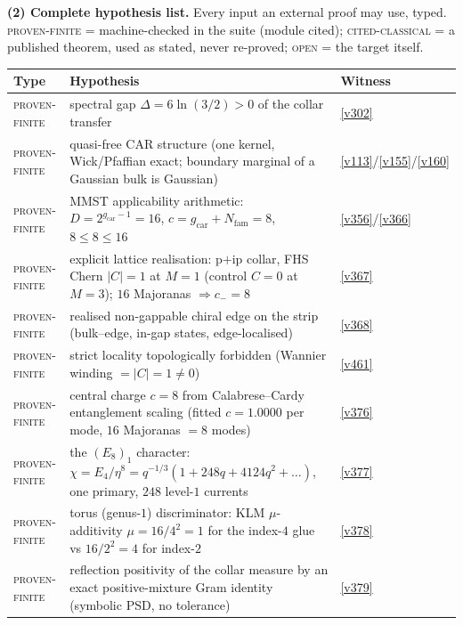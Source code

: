 \documentclass[11pt,a4paper]{article}
\newcommand{\Nfam}{N_{\mathrm{fam}}}
\newcommand{\gcar}{g_{\mathrm{car}}}
\begin{document}
\par\smallskip\noindent\textbf{(2) Complete hypothesis list.} Every input an external proof may
use, typed. \textsc{proven-finite} = machine-checked in the suite (module cited);
\textsc{cited-classical} = a published theorem, used as stated, never re-proved;
\textsc{open} = the target itself.
\begin{center}\footnotesize
\renewcommand{\arraystretch}{1.22}
\begin{tabularx}{\linewidth}{@{}l>{\hsize=1.45\hsize\raggedright\arraybackslash}X>{\hsize=0.55\hsize\raggedright\arraybackslash}X@{}}
\toprule
\textbf{Type} & \textbf{Hypothesis} & \textbf{Witness} \\
\midrule
\textsc{proven-finite} & spectral gap $\Delta=6\ln(3/2)>0$ of the collar transfer & \vref{v302} \\
\textsc{proven-finite} & quasi-free CAR structure (one kernel, Wick/Pfaffian exact; boundary marginal of a Gaussian bulk is Gaussian) & \vref{v113}/\vref{v155}/\vref{v160} \\
\textsc{proven-finite} & MMST applicability arithmetic: $D=2^{\gcar-1}=16$, $c=\gcar+\Nfam=8$, $8\le8\le16$ & \vref{v356}/\vref{v366} \\
\textsc{proven-finite} & explicit lattice realisation: p$+$ip collar, FHS Chern $|C|=1$ at $M{=}1$ (control $C=0$ at $M{=}3$); $16$ Majoranas $\Rightarrow c_-=8$ & \vref{v367} \\
\textsc{proven-finite} & realised non-gappable chiral edge on the strip (bulk--edge, in-gap states, edge-localised) & \vref{v368} \\
\textsc{proven-finite} & strict locality topologically forbidden (Wannier winding $=|C|=1\neq0$) & \vref{v461} \\
\textsc{proven-finite} & central charge $c=8$ from Calabrese--Cardy entanglement scaling (fitted $c=1.0000$ per mode, $16$ Majoranas $=8$ modes) & \vref{v376} \\
\textsc{proven-finite} & the $(E_8)_1$ character: $\chi=E_4/\eta^8=q^{-1/3}(1+248q+4124q^2+\dots)$, one primary, $248$ level-$1$ currents & \vref{v377} \\
\textsc{proven-finite} & torus (genus-$1$) discriminator: KLM $\mu$-additivity $\mu=16/4^2=1$ for the index-$4$ glue vs $16/2^2=4$ for index-$2$ & \vref{v378} \\
\textsc{proven-finite} & reflection positivity of the collar measure by an exact positive-mixture Gram identity (symbolic PSD, no tolerance) & \vref{v379} \\

\end{tabularx}
\end{center}
\end{document}
